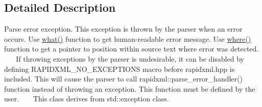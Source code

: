\subsection{Detailed Description}
Parse error exception. This exception is thrown by the parser when an error occurs. Use \hyperlink{classrapidxml_1_1parse__error_a7665c88639e7466ee1de388a4f85e6fe}{what()} function to get human-\/readable error message. Use \hyperlink{classrapidxml_1_1parse__error_a3a0ab9e586c1d2b437c340f6622fbec6}{where()} function to get a pointer to position within source text where error was detected. ~\newline
~\newline
 If throwing exceptions by the parser is undesirable, it can be disabled by defining R\+A\+P\+I\+D\+X\+M\+L\+\_\+\+N\+O\+\_\+\+E\+X\+C\+E\+P\+T\+I\+O\+N\+S macro before rapidxml.\+hpp is included. This will cause the parser to call rapidxml\+::parse\+\_\+error\+\_\+handler() function instead of throwing an exception. This function must be defined by the user. ~\newline
~\newline
 This class derives from {\ttfamily std\+::exception} class. 

